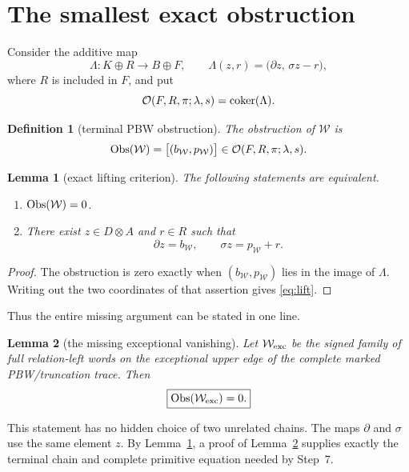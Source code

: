 \documentclass[11pt]{article}
\newtheorem{lemma}{Lemma}
\newtheorem{definition}{Definition}
\newcommand{\coker}{\mathop{\rm coker}}
\newcommand{\Obs}{\mathop{\rm Obs}}
\begin{document}
\section{The smallest exact obstruction}

Consider the additive map
\[
 \Lambda:K\oplus R\longrightarrow B\oplus F,
 \qquad
 \Lambda(z,r)=\bigl(\partial z,\,\sigma z-r\bigr),
\]
where $R$ is included in $F$, and put
\[
       \mathcal O(F,R,\pi;\lambda,s)=\coker(\Lambda).
\]

\begin{definition}[terminal PBW obstruction]
The obstruction of $\mathcal W$ is
\[
       \Obs(\mathcal W)
       =\bigl[(b_{\mathcal W},p_{\mathcal W})\bigr]
       \in\mathcal O(F,R,\pi;\lambda,s).
\]
\end{definition}

\begin{lemma}[exact lifting criterion]\label{lem:criterion}
The following statements are equivalent.
\begin{enumerate}
\item $\Obs(\mathcal W)=0$.
\item There exist $z\in D\otimes A$ and $r\in R$ such that
\begin{equation}
       \partial z=b_{\mathcal W},
       \qquad
       \sigma z=p_{\mathcal W}+r.                 \label{eq:lift}
\end{equation}
\end{enumerate}
\end{lemma}

\begin{proof}
The obstruction is zero exactly when
$(b_{\mathcal W},p_{\mathcal W})$ lies in the image of $\Lambda$.  Writing
out the two coordinates of that assertion gives \eqref{eq:lift}.
\end{proof}

Thus the entire missing argument can be stated in one line.

\begin{lemma}[the missing exceptional vanishing]\label{lem:missing}
Let $\mathcal W_{\rm exc}$ be the signed family of full relation-left words
on the exceptional upper edge of the complete marked PBW/truncation trace.
Then
\[
                         \boxed{\Obs(\mathcal W_{\rm exc})=0.}
\]
\end{lemma}

This statement has no hidden choice of two unrelated chains.  The maps
$\partial$ and $\sigma$ use the same element $z$.  By
Lemma~\ref{lem:criterion}, a proof of Lemma~\ref{lem:missing} supplies exactly
the terminal chain and complete primitive equation needed by Step~7.
\end{document}
